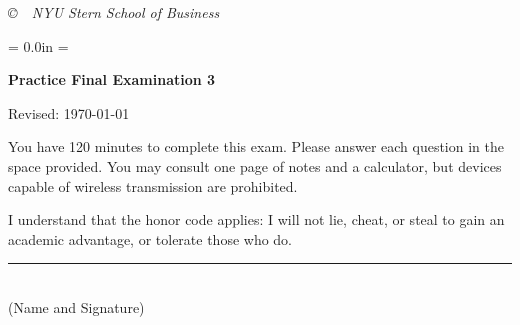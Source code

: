 \documentclass[letterpaper,12pt]{exam}
\def\HeadName{Practice Final Examination 1}
\begin{document}
\vfill \centerline{\it \copyright \ \number\year \
NYU Stern School of Business}



\newpage
\def\HeadName{Practice Final Examination 3}
\parindent = 0.0in
\parskip = \bigskipamount
\setcounter{page}{1} \thispagestyle{empty}
\Head

\centerline{\large \bf \HeadName}%
\centerline{Revised:  \today}

\bigskip
You have 120 minutes to complete this exam.  Please answer each
question in the space provided. You may consult one page of notes
and a calculator, but devices capable of wireless transmission are
prohibited.

I understand that the honor code applies: I will not lie, cheat,
or steal to gain an academic advantage, or tolerate those who do.

\begin{flushright}
\rule{4in}{0.5pt} \\ (Name and Signature)
\end{flushright}
\end{document}

